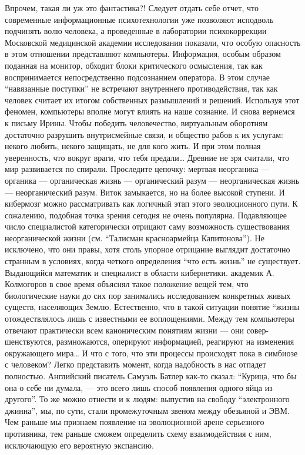 Впрочем, такая ли уж это фантастика?! 
Следует отдать себе отчет, что современные информационные психотехнологии уже позволяют исподволь подчинять волю человека, а проведенные в лаборатории психокоррекции Московской медицинской академии исследования показали, что особую опасность в этом отношении представляют компьютеры. 
Информация, особым образом поданная на монитор, обходит блоки критического осмысления, так как воспринимается непосредственно подсознанием оператора. В этом случае ``навязанные поступки'' не встречают внутреннего противодействия, так как человек считает их итогом собственных размышлений и решений. Используя этот феномен, компьютеры вполне могут влиять на наше сознание. 
И снова вернемся к письму Ирины. Чтобы победить человечество, виртуальным оборотням достаточно разрушить внутрисмейные связи, и общество рабов к их услугам: некого любить, некого защищать, не для кого жить. И при этом полная уверенность, что вокруг враги, что тебя предали… 
Древние не зря считали, что мир развивается по спирали. Проследите цепочку: мертвая неорганика — органика — органическая жизнь — органический разум — неорганическая жизнь — неорганический разум. Виток замыкается, но на более высокой ступени. И кибермозг можно рассматривать как логичный этап этого эволюционного пути. 
К сожалению, подобная точка зрения сегодня не очень популярна. Подавляющее число специалистой категорически отрицают саму возможность существования неорганической жизни (см. ``Талисман красноармейца Капитонова''). Не исключено, что они правы, хотя столь упорное отрицание выглядит достаточно странным в условиях, когда четкого определения ``что есть жизнь'' не существует. 
 Выдающийся математик и специалист в области кибернетики. академик А. Колмогоров в свое время объяснял такое положение вещей тем, что биологические науки до сих пор занимались исследованием конкретных живых существ, населяющих Землю. Естественно, что в такой ситуации понятие ``жизны отождествлялось лишь с известными ее воплощениями. 
 Между тем компьютеры отвечают практически всем каноническим понятиям жизни — они совер- 
шенствуются, размножаются, оперируют информацией, реагируют на изменения окружающего мира… И что с того, что эти процессы происходят пока в симбиозе с человеком? Легко представить момент, когда надобность в нас отпадет полностью. 
Английский писатель Самуэль Батлер как-то сказал: ``Курица, что бы она о себе ни думала, — это всего лишь способ появления одного яйца из другого''. То же можно отнести и к людям: выпустив на свободу ``электронного джинна'', мы, по сути, стали промежуточным звеном между обезьяной и ЭВМ. Чем раньше мы признаем появление на эволюционной арене серьезного противника, тем раньше сможем определить схему взаимодействия с ним, исключающую его вероятную экспансию. 
